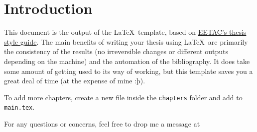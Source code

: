 \chapter{Introduction}

This document is the output of the \LaTeX\ template, based on \href{https://eetac.upc.edu/ca/els-estudis/TFE/maqueta-del-tfe}{EETAC's thesis style guide}. The main benefits of writing your thesis using \LaTeX\ are primarily the consistency of the results (no irreversible changes or different outputs depending on the machine) and the automation of the bibliography. It does take some amount of getting used to its way of working, but this template saves you a great deal of time (at the expense of mine :þ).

To add more chapters, create a new file inside the \verb+chapters+ folder and add \verb++ to \verb+main.tex+.

For any questions or concerns, feel free to drop me a message at 